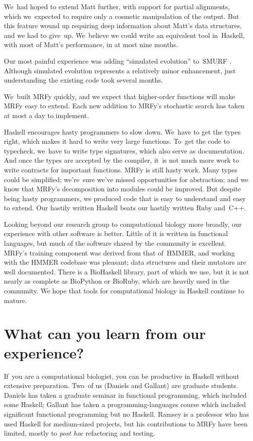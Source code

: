 \documentclass[preprint,nonatbib,blockstyle,times]{sigplanconf}
\let\cite\citep
\begin{document}
We~had hoped to extend Matt further, with support for partial alignments,
which we~expected to require only 
a cosmetic manipulation of the 
output.
But
this feature wound up
requiring deep information about Matt's data structures,
and we had to give~up.
We~believe we could write an equivalent tool in~Haskell,
with most of Matt's performance, in at most nine months.

Our most painful experience was adding ``simulated evolution''
to~SMURF \cite{Daniels:2012}. 
Although simulated evolution represents a relatively minor
enhancement,
just understanding the existing code took several months.

We~built MRFy quickly, and we expect that
higher-order functions will make MRFy easy to extend.
Each new addition to MRFy's stochastic search has taken at most a day
to implement.

Haskell encourages hasty programmers to slow down.
We~have to get the types right,
which makes it hard to write very large functions.
To~get the code to typecheck, we~have to write type signatures, which
also serve as documentation.
And once the types are accepted by the compiler,
it~is not much more work to write contracts for important functions.
MRFy is still hasty work.
Many types could be simplified;
we're~sure we've missed opportunities for abstraction;
and we know that MRFy's decomposition into modules could be improved.
But despite being hasty programmers, we produced code 
that is easy to understand and easy to extend.
Our hastily written Haskell beats
our hastily written Ruby and~C++.


Looking beyond our research group to computational biology more
broadly, our experience with other software is better.
Little of it is written in functional languages, 
but much of the software shared by the community is excellent.
MRFy's training component was derived from that of~HMMER,
and
working with the HMMER 
codebase was pleasant;
data structures and their
mutators are well documented. 
There is a 
BioHaskell library, part of which we use,
but it is not nearly as 
complete as BioPython or BioRuby, which are heavily used in the community.
We hope that tools for computational biology in
Haskell continue to mature. 

\section{What can you learn from our experience?}

If~you are a computational biologist, 
you can be productive in Haskell without extensive preparation.
Two~of us (Daniels and Gallant) are graduate students.
Daniels has taken a graduate seminar in functional programming, which
included some Haskell;
Gallant has taken a programming-languages course which included
significant functional programming but no Haskell.
Ramsey is a professor who has used Haskell 
for medium-sized projects,
but his contributions to MRFy have been limited, mostly to \emph{post hoc}
refactoring and testing.
\end{document}
